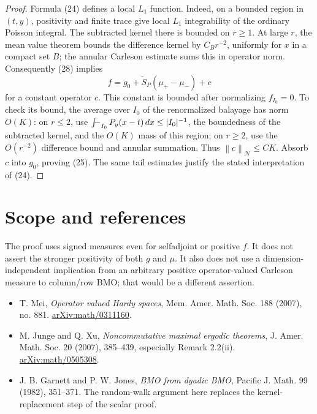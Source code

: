 \documentclass[11pt]{article}
\newcommand{\N}{\mathcal N}
\newcommand{\norm}[1]{\left\|#1\right\|}
\newcommand{\fint}{\mathop{\textstyle\int\kern-1.1ex-}\nolimits}
\begin{document}
\begin{proof}
Formula (24) defines a local \(L_1\) function. Indeed, on a bounded
region in \((t,y)\), positivity and finite trace give local \(L_1\)
integrability of the ordinary Poisson integral. The subtracted kernel
there is bounded on \(r\ge1\). At large \(r\), the mean value theorem
bounds the difference kernel by \(C_B r^{-2}\), uniformly for \(x\)
in a compact set \(B\); the annular Carleson estimate sums this in
operator norm.
Consequently (28) implies
\[
 f=g_0+\widetilde S_P(\mu_+-\mu_-)+c
\]
for a constant operator \(c\). This constant is bounded after normalizing
\(f_{I_0}=0\). To check its bound, the average over \(I_0\) of the
renormalized balayage has norm \(O(K)\): on \(r\le2\), use
\(\fint_{I_0}P_y(x-t)\,dx\le |I_0|^{-1}\), the boundedness of
the subtracted kernel, and the \(O(K)\) mass of this region; on
\(r\ge2\), use the \(O(r^{-2})\) difference bound and annular summation.
Thus \(\norm{c}_\N\le CK\). Absorb \(c\) into \(g_0\), proving (25).
The same tail estimates justify the stated interpretation of (24).
\end{proof}

\section*{Scope and references}
The proof uses signed measures even for selfadjoint or positive \(f\).
It does not assert the stronger positivity of both \(g\) and \(\mu\).
It also does not use a dimension-independent implication from an arbitrary
positive operator-valued Carleson measure to column/row BMO; that would
be a different assertion.

\begin{itemize}
\item T. Mei, \emph{Operator valued Hardy spaces}, Mem. Amer. Math. Soc.
188 (2007), no. 881.
\href{https://arxiv.org/abs/math/0311160}{arXiv:math/0311160}.
\item M. Junge and Q. Xu, \emph{Noncommutative maximal ergodic theorems},
J. Amer. Math. Soc. 20 (2007), 385--439, especially Remark 2.2(ii).
\href{https://arxiv.org/abs/math/0505308}{arXiv:math/0505308}.
\item J. B. Garnett and P. W. Jones, \emph{BMO from dyadic BMO},
Pacific J. Math. 99 (1982), 351--371.
The random-walk argument here replaces the kernel-replacement step
of the scalar proof.
\end{itemize}
\end{document}
